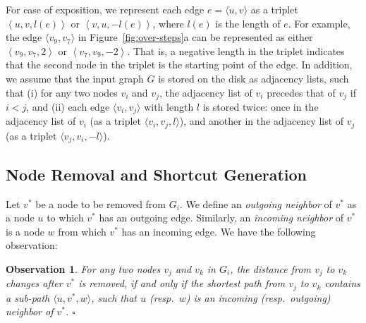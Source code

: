 \documentclass{sig-alternate}
\newtheorem{observation} {Observation}
\def\done{\hspace*{\fill} {$\square$}}
\def\v{v^*}
\begin{document}
\begin{sloppy}
For ease of exposition, we represent each edge $e = \langle u, v \rangle$ as a triplet $\left\langle u, v, l(e)\right\rangle$ or $\left\langle v, u, -l(e)\right\rangle$, where $l(e)$ is the length of $e$. For example, the edge $\langle v_9, v_7 \rangle$ in Figure~\ref{fig:over-steps}a can be represented as either $\left\langle v_9, v_7, 2\right\rangle$ or $\left\langle v_7, v_9, -2\right\rangle$. That is, a negative length in the triplet indicates that the second node in the triplet is the starting point of the edge. In addition, we assume that the input graph $G$ is stored on the disk as adjacency lists, such that (i) for any two nodes $v_i$ and $v_j$, the adjacency list of $v_i$ precedes that of $v_j$ if $i < j$, and (ii) each edge $\langle v_i, v_j\rangle$ with length $l$ is stored twice: once in the adjacency list of $v_i$ (as a triplet $\langle v_i, v_j, l\rangle$), and another in the adjacency list of $v_j$ (as a triplet $\langle v_j, v_i, -l\rangle$).

\subsection{Node Removal and Shortcut Generation} \label{sec:pre-removal}

Let $\v$ be a node to be removed from $G_{i}$. We define an {\em outgoing neighbor} of $\v$ as a node $u$ to which $\v$ has an outgoing edge. Similarly, an {\em incoming neighbor} of $\v$ is a node $w$ from which $\v$ has an incoming edge. We have the following observation:


\vspace{-1mm}
\begin{observation} \label{observ:pre-neighbor}
\em
For any two nodes $v_j$ and $v_k$ in $G_i$, the distance from $v_j$ to $v_k$ changes after $\v$ is removed, if and only if the shortest path from $v_j$ to $v_k$ contains a sub-path $\langle u, \v, w\rangle$, such that $u$ (resp.\ $w$) is an incoming (resp.\ outgoing) neighbor of $\v$. \done
\end{observation}
\vspace{-1mm}



\end{sloppy}
\end{document}
